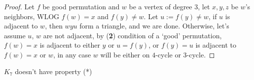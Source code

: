 \begin{proof}
    Let $f$ be good permutation and $w$ be a vertex of degree 3, let $x, y, z$ be $w$'s neighbors, WLOG $f(w) = x$ and $f(y) \neq w$.
    Let $u := f(y) \neq w$, if $u$ is adjacent to $w$, then $wyu$ form a triangle, and we are done. \newline
    Otherwise, let's assume $u$, $w$
    are not adjacent, by (\textbf{2}) condition of a `good' permutation, $f(w) = x$ is adjacent to either $y$ or $u = f(y)$, or $f(y) = u$ is adjacent
    to $f(w) = x$ or $w$, in any case $w$ will be either on $4$-cycle or $3$-cycle.
\end{proof}

\begin{thm}
    $K_{7}$ doesn't have property (*)
\end{thm}

